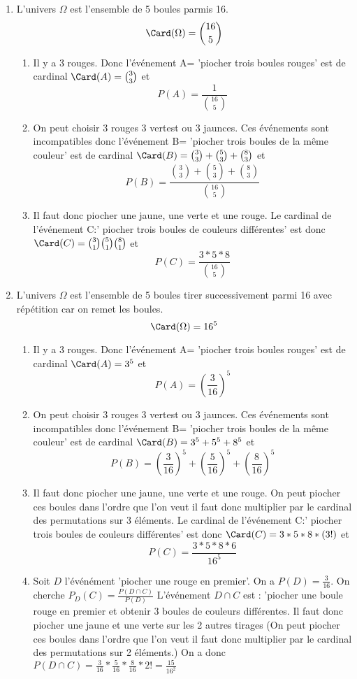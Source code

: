 \begin{correction}
\begin{enumerate}
\item L'univers $\Omega$ est l'ensemble de 5 boules parmis 16.
$$\Card(\Omega)  =\binom{16}{5}$$
 \begin{enumerate}

\item Il y a 3 rouges. Donc l'événement A= 'piocher trois boules rouges' est de cardinal $\Card(A) = \binom{3}{3}$
et $$P(A) = \frac{1}{\binom{16}{5}}$$
\item On peut choisir 3 rouges 3 vertest ou 3 jaunces. Ces événements sont incompatibles donc l'événement B= 'piocher trois boules de la même couleur' est de cardinal $\Card(B) = \binom{3}{3}+\binom{5}{3}+\binom{8}{3} $
et $$P(B) = \frac{\binom{3}{3}+\binom{5}{3}+\binom{8}{3}}{\binom{16}{5}}$$
\item Il faut donc piocher une jaune, une verte et une rouge. Le cardinal de l'événement C:' piocher trois boules de couleurs différentes' est donc 
$\Card( C)  = \binom{3}{1}\binom{5}{1}\binom{8}{1} $
et $$P(C) = \frac{3*5*8}{\binom{16}{5}}$$

\end{enumerate}
\item L'univers $\Omega$ est l'ensemble de 5 boules tirer successivement  parmi 16 avec répétition  car on remet les boules. 
$$\Card(\Omega)  =16^5$$
\begin{enumerate}


\item Il y a 3 rouges. Donc l'événement A= 'piocher trois boules rouges' est de cardinal $\Card(A) = 3^5$
et $$P(A) = \left(\frac{3}{16}\right)^5$$

\item On peut choisir 3 rouges 3 vertest ou 3 jaunces. Ces événements sont incompatibles donc l'événement B= 'piocher trois boules de la même couleur' est de cardinal $\Card(B) = 3^5+5^5+8^5$
et $$P(B) =\left(\frac{3}{16}\right)^5+\left(\frac{5}{16}\right)^5+\left(\frac{8}{16}\right)^5$$

\item Il faut donc piocher une jaune, une verte et une rouge. On peut piocher ces boules dans l'ordre que l'on veut il faut donc multiplier par le cardinal des permutations sur 3 éléments. Le cardinal de l'événement C:' piocher trois boules de couleurs différentes' est donc 
$\Card( C)  =3*5*8 *(3!) $
et $$P(C) = \frac{3*5*8*6}{16^5}$$
\item Soit $D$ l'événément 'piocher une rouge en premier'. 
On a $P(D) = \frac{3}{16}$. 
On cherche $P_D(C)= \frac{P(D\cap C)}{P(D)}$
L'événement $D\cap C$ est : 'piocher une boule rouge en premier et obtenir 3 boules de couleurs différentes. 
Il faut donc piocher une jaune et une verte sur les 2 autres tirages (On peut piocher ces boules dans l'ordre que l'on veut il faut donc multiplier par le cardinal des permutations sur 2 éléments.)
On a donc $P(D\cap C)  =\frac{3}{16}*\frac{5}{16}*\frac{8}{16}*2!=\frac{15}{16^2}$


\end{enumerate}
\end{enumerate}
\end{correction}
